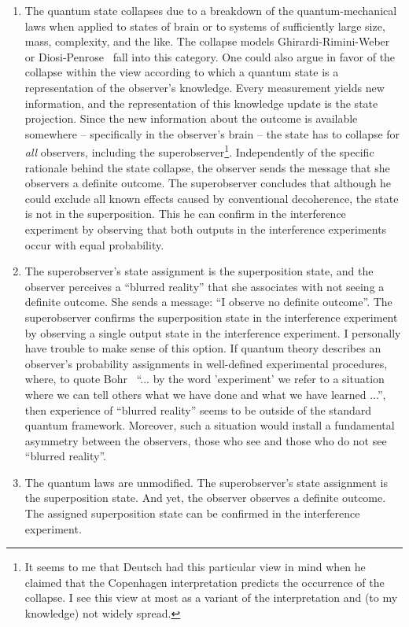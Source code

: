 \documentclass[12pt]{article}
\begin{document}
\begin{enumerate}

\item The quantum state collapses due to a breakdown of the quantum-mechanical laws when applied to states of brain or to systems of sufficiently large size, mass, complexity, and the like. The collapse models Ghirardi-Rimini-Weber~\cite{GRW} or Diosi-Penrose~\cite{diosi,penrose} fall into this category. One could also argue in favor of the collapse within the view according to which a quantum state is a representation of the observer's knowledge. Every measurement yields new information, and the representation of this knowledge update is the state projection. Since the new information about the outcome is available somewhere -- specifically in the observer's brain -- the state has to collapse for {\it all} observers, including the superobserver\footnote{It seems to me that Deutsch had this particular view in mind when he claimed that the Copenhagen interpretation predicts the occurrence of the collapse. I see this view at most as a variant of the interpretation and (to my knowledge) not widely spread.}. Independently of the specific rationale behind the state collapse, the observer sends the message that she observers a definite outcome. The superobserver concludes that although he could exclude all known effects caused by conventional decoherence, the state is not in the superposition. This he can confirm in the interference experiment by observing that both outputs in the interference experiments occur with equal probability.  

\item The superobserver's state assignment is the superposition state, and the observer perceives a ``blurred reality'' that she associates with not seeing a definite outcome. She sends a message: ``I observe no definite outcome''. The superobserver confirms the superposition state in the interference experiment by observing a single output state in the interference experiment. I personally have trouble to make sense of this option. If quantum theory describes an  observer's probability assignments in well-defined experimental procedures, where, to quote Bohr~\cite{bohr2} ``... by the word 'experiment' we refer to a situation where we can tell others what we have done and what we have learned ...'', then experience of ``blurred reality'' seems to be outside of the standard quantum framework. Moreover, such a situation would install a fundamental asymmetry between the observers, those who see and those who do not see ``blurred reality''.

\item The quantum laws are unmodified. The superobserver's state assignment is the superposition state. And yet, the observer observes a definite outcome. The assigned superposition state can be confirmed in the interference experiment. 

\end{enumerate}
\end{document}
